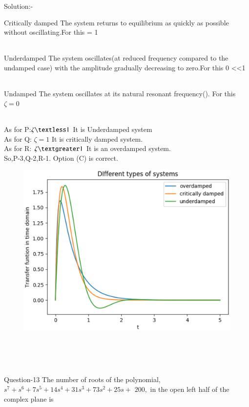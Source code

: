 \documentclass[journal,12pt,twocolumn]{IEEEtran}
\begin{document}
\begin{frame}{Solution:- }
\begin{frame}{}
\begin{block}{Critically damped}
The system returns to equilibrium as quickly as possible without oscillating.For this \zeta = 1 \\\\
\end{block}
\end{frame}
\begin{frame}{}
\begin{block}{Underdamped}
The system oscillates(at reduced frequency compared to the undamped case) with the amplitude gradually decreasing to zero.For this 0 \textless\zeta\textless1
\\\\
\end{block}
\begin{block}{Undamped}
The system oscillates at its natural resonant frequency(). For this $\zeta=0$
\\\\
\end{block}    
\end{frame}
\begin{frame}{}
 As for P:$\zeta \textless 1$
It is Underdamped system\\
As for Q: $\zeta =1$
It is critically damped system.\\
 As for R: $\zeta \textgreater 1$
It is an overdamped system.\\
\vspace{10mm}
So,P-3,Q-2,R-1. Option (C) is correct.
\end{frame}
\begin{frame}{}
\begin{figure}
    \centering
    \includegraphics[width=1.1\linewidth]{./figs/Damping.eps}
\end{figure}
\end{frame}
\\\\\\
\begin{frame}{Question-13 }
The number of roots of the polynomial, $s^{7}+s^{6}+7 s^{5}+14 s^{4}+31s^{3}+73 s^{2}+25 s+$ $200,$ in the open left half of the complex plane is


\end{frame}
\end{frame}
\end{document}
